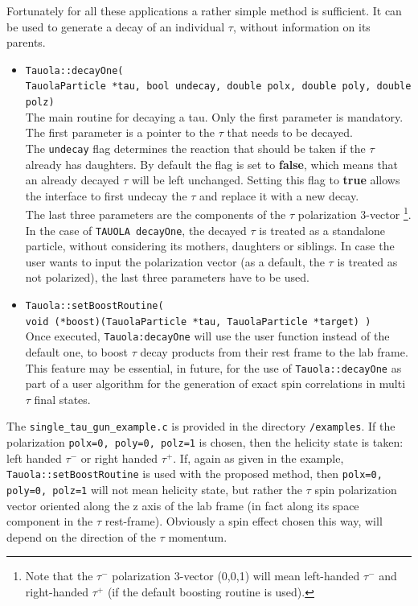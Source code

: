 \documentclass[]{Tauola_interface_design}
\begin{document}
Fortunately for all these applications a rather simple method is sufficient.
 It can be used to generate a decay of
an individual $\tau$, without information on its parents.
\begin{itemize}
  \item {\tt Tauola::decayOne( \\ TauolaParticle *tau, bool undecay, double polx, double poly, double polz) } \hfill \\
	The main routine for decaying a tau. Only the first parameter is mandatory. The first parameter is a pointer to the $\tau$
         that needs to be decayed. \\
	The {\tt undecay} flag determines the reaction that should be taken if the $\tau$ already has daughters. 
        By default the flag is set to {\bf false}, which means that an already decayed $\tau$ will be left unchanged. 
        Setting this flag to {\bf true} allows the interface to first undecay the $\tau$ and replace it with a new decay.\\

	The last three parameters are the components of the $\tau$ polarization 3-vector%
	\footnote{Note that the $\tau^-$ polarization 3-vector (0,0,1) will mean left-handed
	$\tau^-$ and right-handed $\tau^+$ (if the default boosting routine is used). }.
	In the case of {\tt TAUOLA decayOne}, 
        the decayed $\tau$ is treated as a standalone particle, without considering its mothers, daughters or 
        siblings. In case the user wants to input the polarization vector (as a default, the $\tau$ is treated as
not polarized), 
the last three parameters have to be used.
  \item {\tt Tauola::setBoostRoutine( \\ void (*boost)(TauolaParticle *tau, TauolaParticle *target) ) } \\
        Once executed, {\tt Tauola:decayOne}  will use the user function instead of the default one, to boost $\tau$ decay 
        products from their rest frame to the lab frame. This feature may be essential, in future, 
        for the use of {\tt Tauola::decayOne} as part of a user algorithm for the 
generation of exact spin correlations  in multi $\tau$ final states.

\end{itemize}

The {\tt single\_tau\_gun\_example.c} is provided in the directory {\tt /examples}. If the polarization 
{\tt polx=0, poly=0, polz=1} is chosen, then the helicity state is taken:
left handed $\tau^-$ or right handed $\tau^+$.  If, again as given in the example, {\tt Tauola::setBoostRoutine} is used
with the proposed method, then {\tt polx=0, poly=0, polz=1} will not mean helicity state,
but rather the $\tau$ spin polarization vector oriented along the z axis of the lab frame (in fact along
its space component in the $\tau$ rest-frame). 
Obviously
a spin effect chosen this way, will depend on the direction of the $\tau$ momentum. 
\end{document}
